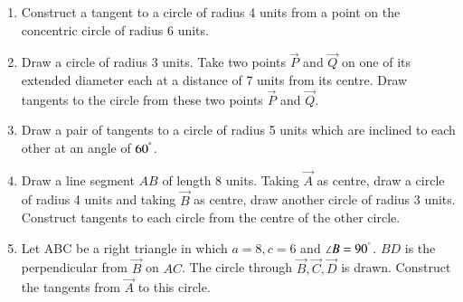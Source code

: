 \documentclass[journal,12pt,twocolumn]{IEEEtran}
\renewcommand\thesection{\arabic{section}}
\begin{document}
\begin{enumerate}[label=\thesection.\arabic*
,ref=\thesection.\theenumi]
\item Construct a tangent to a circle of radius 4 units from a point on the concentric circle of radius 6 
units.
\item Draw a circle of radius 3 units. Take  two points $\vec{P}$ and $\vec{Q}$ on one of its extended 
diameter each at a distance of 7 units from its centre. Draw tangents to the circle from these two points 
$\vec{P}$ and $\vec{Q}$.
\item Draw a pair of tangents to a circle of radius 5 units which are inclined to each other at an angle of 
$60^{\degree}$.
\item Draw a line segment $AB$ of length 8 units. Taking $\vec{A}$ as centre, draw a circle of radius 4 units 
and taking $\vec{B}$ as centre, draw another circle of radius 3 units. Construct tangents to each circle from 
the centre of the other circle.
\item Let ABC be a right triangle in which $a = 8, c = 6$ and $\angle B = 90^{\degree}$.  $BD$ is the 
perpendicular from $\vec{B}$ on $AC$. The circle through $\vec{B}, \vec{C}, \vec{D}$ is drawn.  Construct the 
tangents from $\vec{A}$ to this circle.
\end{enumerate}
\end{document}
